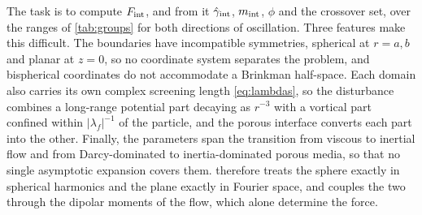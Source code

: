 The task is to compute $F_{\rm int}$, and from it $\hat\gamma_{\rm int}$, $m_{\rm int}$, $\phi$ and the crossover set,
over the ranges of \cref{tab:groups} for both directions of oscillation. Three features make this difficult. The
boundaries have incompatible symmetries, spherical at $r=a,b$ and planar at $z=0$, so no coordinate system separates
the problem, and bispherical coordinates do not accommodate a Brinkman half-space. Each domain also carries its own
complex screening length \eqref{eq:lambdas}, so the disturbance combines a long-range potential part decaying as $r^{-3}$
with a vortical part confined within $|\lambda_f|^{-1}$ of the particle, and the porous interface converts each part
into the other. Finally, the parameters span the transition from viscous to inertial flow and from Darcy-dominated to
inertia-dominated porous media, so that no single asymptotic expansion covers them.  therefore
treats the sphere exactly in spherical harmonics and the plane exactly in Fourier space, and couples the two through
the dipolar moments of the flow, which alone determine the force.

